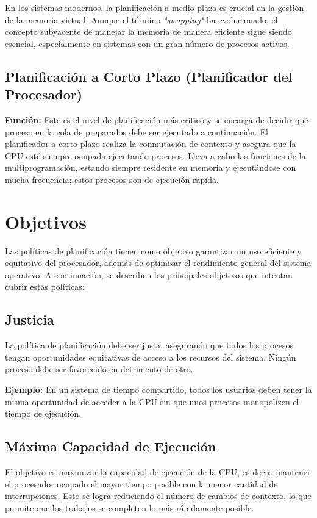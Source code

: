 En los sistemas modernos, la planificación a medio plazo es crucial en la gestión de la memoria virtual. Aunque el término \textit{"swapping"} ha evolucionado, el concepto subyacente de manejar la memoria de manera eficiente sigue siendo esencial, especialmente en sistemas con un gran número de procesos activos.



\subsection{Planificación a Corto Plazo (Planificador del Procesador)}

\textbf{Función:} Este es el nivel de planificación más crítico y se encarga de decidir qué proceso en la cola de preparados debe ser ejecutado a continuación. El planificador a corto plazo realiza la conmutación de contexto y asegura que la CPU esté siempre ocupada ejecutando procesos. Lleva a cabo las funciones de la multiprogramación, estando siempre residente en memoria y ejecutándose con mucha frecuencia; estos procesos son de ejecución rápida.

\section{Objetivos}

Las políticas de planificación tienen como objetivo garantizar un uso eficiente y equitativo del procesador, además de optimizar el rendimiento general del sistema operativo. A continuación, se describen los principales objetivos que intentan cubrir estas políticas:

\subsection{Justicia}
La política de planificación debe ser justa, asegurando que todos los procesos tengan oportunidades equitativas de acceso a los recursos del sistema. Ningún proceso debe ser favorecido en detrimento de otro.

\textbf{Ejemplo:} En un sistema de tiempo compartido, todos los usuarios deben tener la misma oportunidad de acceder a la CPU sin que unos procesos monopolizen el tiempo de ejecución.

\subsection{Máxima Capacidad de Ejecución}
El objetivo es maximizar la capacidad de ejecución de la CPU, es decir, mantener el procesador ocupado el mayor tiempo posible con la menor cantidad de interrupciones. Esto se logra reduciendo el número de cambios de contexto, lo que permite que los trabajos se completen lo más rápidamente posible.

